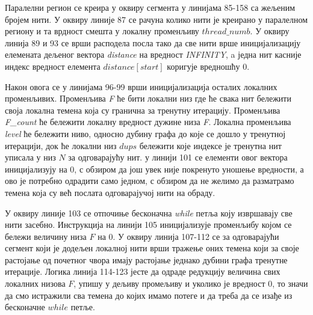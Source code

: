 \par
Паралелни регион се креира у оквиру сегмента у линијама 85-158 са жељеним бројем нити. У оквиру линије 87 се рачуна колико нити је креирано у паралелном региону и та врдност смешта у локалну променљиву $thread\_numb$. У оквиру линија 89 и 93 се врши расподела посла тако да све нити врше иницијализацију елемената дељеног вектора \textit{distance} на вредност \textit{INFINITY}, a једна нит касније индекс вредност елемента $distance[start]$ коригује вредношћу $0$.

\par
Након овога се у линијама 96-99 врши иницијализација осталих локалних променљивих. Променљива \textit{F} ће бити локални низ где ће свака нит бележити своја локална темена која су гранична за тренутну итерацију. Променљива \textit{F\_count} ће бележити локалну вредност дужине низа \textit{F}. Локална променљива \textit{level} ће бележити ниво, односно дубину графа до које се дошло у тренутној итерацији, док ће локални низ $dups$ бележити које индексе је тренутна нит уписала у низ $N$ за одговарајућу нит. у линији 101 се елементи овог вектора иницијализују на $0$, с обзиром да још увек није покренуто уношење вредности, а ово је потребно одрадити само једном, с обзиром да не желимо да разматрамо темена која су већ послата одговарајучој нити на обраду.

\par
У оквиру линије 103 се отпочиње бесконачна \textit{while} петља коју извршавају све нити засебно. Инструкција на линији 105 иницијализује променљибу којом се бележи величину низа $F$ на $0$. У оквиру линија 107-112 се за одговарајући сегмент који је додељен локалној нити врши тражење оних темена који за своје растојање од почетног чвора имају растојање једнако дубини графа тренутне итерације. Логика линија 114-123 јесте да одраде редукцију величина свих локалних низова $F$, упишу у дељиву промељиву и уколико је вредност $0$, то значи да смо истражили сва темена до којих имамо потеге и да треба да се изађе из бесконачне $while$ петље.

